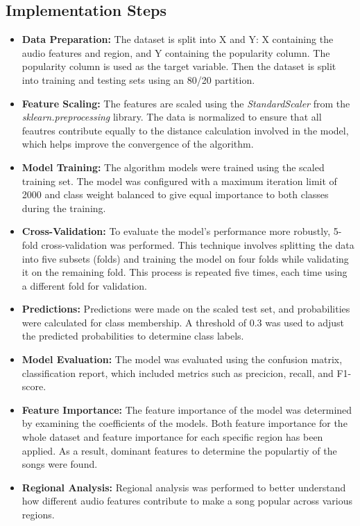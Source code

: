 \subsection{Implementation Steps}
\begin{itemize}
    \item \textbf{Data Preparation: } The dataset is split into X and Y: X containing the audio features and region, and Y containing the popularity column.
    The popularity column is used as the target variable. Then the dataset is split into training and testing sets using an 80/20 partition.
    \item \textbf{Feature Scaling: } The features are scaled using the \textit{StandardScaler} from the \textit{sklearn.preprocessing} library. The data is normalized to ensure that all feautres contribute equally to the distance calculation involved in the model, which helps improve the convergence of the algorithm.
  
    \item \textbf{Model Training: } The algorithm models were trained using the scaled training set. The model was
    configured with a maximum iteration limit of 2000 and class weight balanced to give equal importance to both classes during the training.
    \item \textbf{Cross-Validation: } To evaluate the model's performance more robustly, 5-fold cross-validation was performed.
    This technique involves splitting the data into five subsets (folds) and training the model on four folds while validating it on the remaining
    fold. This process is repeated five times, each time using a different fold for validation.
    \item \textbf{Predictions: } Predictions were made on the scaled test set, and probabilities were calculated for class membership. A threshold of 0.3 was used to adjust the predicted probabilities to determine class labels.
    \item \textbf{Model Evaluation: } The model was evaluated using the confusion matrix, classification report, which included metrics such as precicion, recall, and F1-score.
    \item \textbf{Feature Importance: } The feature importance of the model was determined by examining the coefficients of the models. Both feature importance for the whole dataset and feature importance for each specific region has been applied. As a result, dominant features to determine the populartiy of the songs were found.
    \item \textbf{Regional Analysis: } Regional analysis was performed to better understand how different audio features contribute to make a song popular across various regions.
\end{itemize} 


